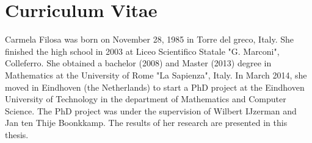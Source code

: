 \chapter*{Curriculum Vitae}
\markboth{}{}
Carmela Filosa was born on November 28, 1985 in Torre del greco, Italy. She finished the high school in 2003 at Liceo Scientifico Statale "G. Marconi", Colleferro. She obtained a bachelor (2008) and Master (2013) degree in Mathematics at the University of Rome "La Sapienza", Italy. In March 2014, she moved in Eindhoven (the Netherlands) to start a PhD project at the Eindhoven University of Technology in the department of Mathematics and Computer Science. The PhD project was under the supervision of Wilbert IJzerman and Jan ten Thije Boonkkamp. 
The results of her research are presented in this thesis.  

